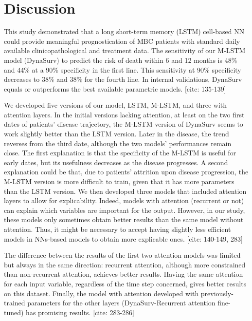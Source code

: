 \documentclass[a4paper,10pt]{article}
\begin{document}
\section{Discussion}
This study demonstrated that a long short-term memory (LSTM) cell-based NN could provide meaningful prognostication of MBC patients with standard daily available clinicopathological and treatment data. The sensitivity of our M-LSTM model (DynaSurv) to predict the risk of death within 6 and 12 months is 48\% and 44\% at a 90\% specificity in the first line. This sensitivity at 90\% specificity decreases to 38\% and 38\% for the fourth line. In internal validations, DynaSurv equals or outperforms the best available parametric models. [cite: 135-139]

We developed five versions of our model, LSTM, M-LSTM, and three with attention layers. In the initial versions lacking attention, at least on the two first dates of patients' disease trajectory, the M-LSTM version of DynaSurv seems to work slightly better than the LSTM version. Later in the disease, the trend reverses from the third date, although the two models' performances remain close. The first explanation is that the specificity of the M-LSTM is useful for early dates, but its usefulness decreases as the disease progresses. A second explanation could be that, due to patients' attrition upon disease progression, the M-LSTM version is more difficult to train, given that it has more parameters than the LSTM version. We then developed three models that included attention layers to allow for explicability. Indeed, models with attention (recurrent or not) can explain which variables are important for the output. However, in our study, these models only sometimes obtain better results than the same model without attention. Thus, it might be necessary to accept having slightly less efficient models in NNs-based models to obtain more explicable ones. [cite: 140-149, 283]

The difference between the results of the first two attention models was limited but always in the same direction: recurrent attention, although more constrained than non-recurrent attention, achieves better results. Having the same attention for each input variable, regardless of the time step concerned, gives better results on this dataset. Finally, the model with attention developed with previously-trained parameters for the other layers (DynaSurv-Recurrent attention fine-tuned) has promising results. [cite: 283-286]
\end{document}
